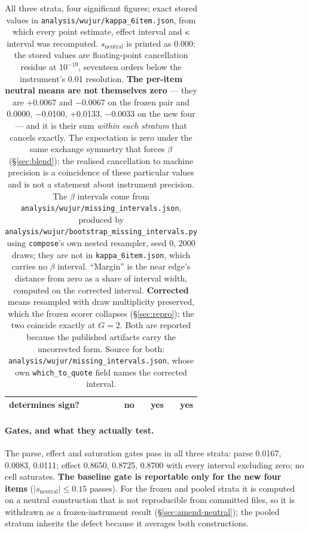 \documentclass{article}
\providecommand{\textminus}{\ensuremath{-}}
\begin{document}
\begin{table}[htbp]
\begin{tabular}{lrrr}
    \hspace{1em}determines sign? & \textbf{no} & yes & \textbf{yes} \\
    \bottomrule
  \end{tabular}
  \caption{All three strata, four significant figures; exact stored values in
  \texttt{analysis/\allowbreak wujur/\allowbreak kappa\_\allowbreak 6item.json}, from which every point estimate,
  effect interval and $\kappa$ interval was recomputed.
  $s_{\text{neutral}}$ is printed as 0.000: the stored values are
  floating-point cancellation residue at $10^{-19}$, seventeen orders below the
  instrument's 0.01 resolution. \textbf{The per-item neutral means are not
  themselves zero} --- they are +0.0067 and \textminus 0.0067 on the frozen pair and
  0.0000, \textminus 0.0100, +0.0133, \textminus 0.0033 on the new four --- and it is their
  sum \emph{within each stratum} that cancels exactly. The expectation is zero
  under the same exchange symmetry that forces $\beta$
  (\S\ref{sec:blend}); the realised cancellation to machine precision is a
  coincidence of these particular values and is not a statement about
  instrument precision. The $\beta$ intervals come from
  \texttt{analysis/\allowbreak wujur/\allowbreak missing\_\allowbreak intervals.json}, produced by
  \texttt{analysis/\allowbreak wujur/\allowbreak bootstrap\_\allowbreak missing\_\allowbreak intervals.py} using
  \texttt{compose}'s own nested resampler, seed 0, 2000 draws; they are not in
  \texttt{kappa\_6item.json}, which carries no $\beta$ interval. ``Margin'' is the near edge's distance from zero as a share of interval
  width, computed on the corrected interval. \textbf{Corrected} means
  resampled with draw multiplicity preserved, which the frozen scorer collapses
  (\S\ref{sec:repro}); the two coincide exactly at $G=2$. Both are reported
  because the published artifacts carry the uncorrected form. Source for both:
  \texttt{analysis/\allowbreak wujur/\allowbreak missing\_\allowbreak intervals.json}, whose own
  \texttt{which\_to\_quote} field names the corrected interval.}
  \label{tab:strata}
\end{table}

\paragraph{Gates, and what they actually test.} The parse, effect and saturation gates pass in all three strata:
  parse 0.0167, 0.0083, 0.0111; effect 0.8650, 0.8725, 0.8700 with
  every interval excluding zero; no cell saturates. \textbf{The baseline gate is
  reportable only for the new four items} ($|s_{\text{neutral}}| \le 0.15$
  passes). For the frozen and pooled strata it is computed on a neutral
  construction that is not reproducible from committed files, so it is withdrawn
  as a frozen-instrument result (\S\ref{sec:amend-neutral}); the pooled stratum
  inherits the defect because it averages both constructions.
\end{document}
